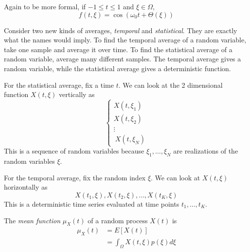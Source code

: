 Again to be more formal, if $-1 \leq t \leq 1$
and $\xi \in \Omega$,
\begin{equation}
    f(t, \xi) = \cos(\omega_0 t + \Theta(\xi))
\end{equation}

Consider two new kinds of averages, \emph{temporal}
and \emph{statistical}. They are exactly what the names
would imply. To find the temporal average of a random
variable, take one sample and average it over time.
To find the statistical average of a random variable,
average many different samples. The temporal average
gives a random variable, while the statistical average
gives a deterministic function.

For the statistical average, fix a time $t$. We can
look at the 2 dimensional function $X(t, \xi)$ vertically as
\begin{equation}
    \begin{cases}
        X(t, \xi_1) \\
        X(t, \xi_2) \\
        \vdots      \\\
        X(t, \xi_N)
    \end{cases}
\end{equation}
This is a sequence of random variables because
$\xi_1, \dots, \xi_N$ are realizations of the
random variables $\xi$.

For the temporal average, fix the random index
$\xi$. We can look at $X(t, \xi)$ horizontally as
\begin{equation}
    X(t_1, \xi), X(t_2, \xi), \dots, X(t_K, \xi)
\end{equation}
This is a deterministic time series evaluated at
time points $t_1, \dots, t_K$.

The \emph{mean function} $\mu_X(t)$ of a random process
$X(t)$ is
\begin{align}
    \mu_X(t) & = E[X(t)]                             \\
             & = \int_{\Omega} X(t, \xi) p(\xi) d\xi
\end{align}